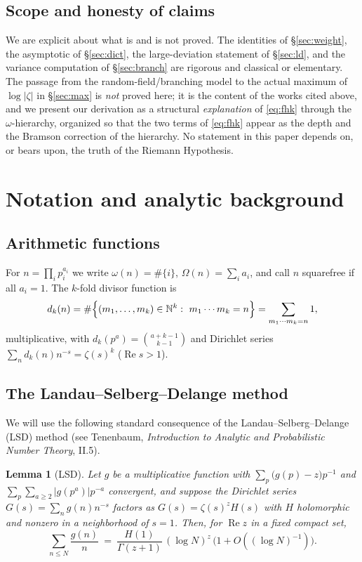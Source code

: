 \documentclass[11pt]{amsart}
\newtheorem{lemma}[theorem]{Lemma}
\theoremstyle{definition}
\newcommand{\NN}{\mathbb N}
\newcommand{\re}{\operatorname{Re}}
\newcommand{\dk}{d_k}
\begin{document}
\subsection{Scope and honesty of claims}
We are explicit about what is and is not proved. The identities of \S\ref{sec:weight}, the asymptotic of
\S\ref{sec:dict}, the large-deviation statement of \S\ref{sec:ld}, and the variance computation of
\S\ref{sec:branch} are rigorous and classical or elementary. The passage from the random-field/branching model
to the actual maximum of $\log|\zeta|$ in \S\ref{sec:max} is \emph{not} proved here; it is the content of the
works cited above, and we present our derivation as a structural \emph{explanation} of \eqref{eq:fhk} through the
$\omega$-hierarchy, organized so that the two terms of \eqref{eq:fhk} appear as the depth and the Bramson
correction of the hierarchy. No statement in this paper depends on, or bears upon, the truth of the Riemann
Hypothesis.

\section{Notation and analytic background}\label{sec:prelim}

\subsection{Arithmetic functions}
For $n=\prod_i p_i^{a_i}$ we write $\omega(n)=\#\{i\}$, $\Omega(n)=\sum_i a_i$, and call $n$ squarefree if all
$a_i=1$. The $k$-fold divisor function is
\[
\dk(n)=\#\Bigl\{(m_1,\dots,m_k)\in\NN^k:\ m_1\cdots m_k=n\Bigr\}=\sum_{m_1\cdots m_k=n}1,
\]
multiplicative, with $\dk(p^a)=\binom{a+k-1}{k-1}$ and Dirichlet series $\sum_n\dk(n)n^{-s}=\zeta(s)^k$
($\re s>1$).

\subsection{The Landau--Selberg--Delange method}
We will use the following standard consequence of the Landau--Selberg--Delange (LSD) method
(see Tenenbaum, \emph{Introduction to Analytic and Probabilistic Number Theory}, II.5).

\begin{lemma}[LSD]\label{lem:lsd}
Let $g$ be a multiplicative function with $\sum_p\bigl(g(p)-z\bigr)p^{-1}$ and $\sum_p\sum_{a\ge2}|g(p^a)|p^{-a}$
convergent, and suppose the Dirichlet series $G(s)=\sum_n g(n)n^{-s}$ factors as $G(s)=\zeta(s)^z H(s)$ with
$H$ holomorphic and nonzero in a neighborhood of $s=1$. Then, for $\re z$ in a fixed compact set,
\[
\sum_{n\le N}\frac{g(n)}{n}\ =\ \frac{H(1)}{\Gamma(z+1)}\,(\log N)^{z}\,\bigl(1+O((\log N)^{-1})\bigr).
\]
\end{lemma}
\end{document}
